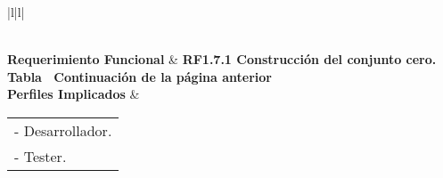 \begin{longtable}{|l|l|}
\caption{Prueba unitaria RF1.7.1}
\label{PU_RF1_7_1}\\
\hline
\textbf{Requerimiento Funcional}                                                       & \textbf{RF1.7.1 Construcción del conjunto cero.}                                                                                                                                                                                                                                                                                                                                                                                                                                                                                                                                                                                                                                                                                                                                                                                            \\ \hline
\endfirsthead
%
%
{{\bfseries Tabla \thetable\ Continuación de la página anterior}} \\
\endhead
%
\textbf{Perfiles Implicados}                                                           & \begin{tabular}[c]{@{}l@{}}- Desarrollador.\\ - Tester.\end{tabular}                                                                                                                                                                                                                                                                                                                                                                                                                                                                                                                                                                                                                                                                                                                                                                        \\ \hline

\end{longtable}
